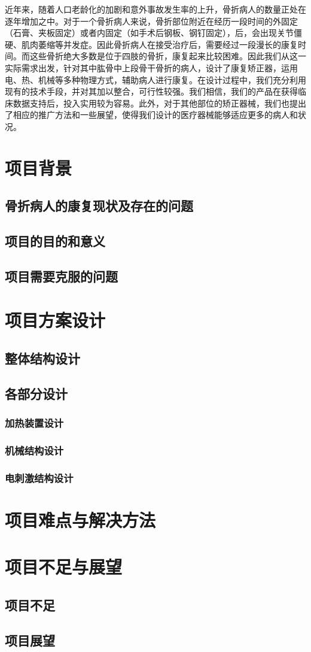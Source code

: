 \documentclass[UTF8]{ctexart}
\begin{document}
    近年来，随着人口老龄化的加剧和意外事故发生率的上升，骨折病人的数量正处在逐年增加之中。对于一个骨折病人来说，骨折部位附近在经历一段时间的外固定（石膏、夹板固定）或者内固定（如手术后钢板、钢钉固定），后，会出现关节僵硬、肌肉萎缩等并发症。因此骨折病人在接受治疗后，需要经过一段漫长的康复时间。而这些骨折绝大多数是位于四肢的骨折，康复起来比较困难。因此我们从这一实际需求出发，针对其中肱骨中上段骨干骨折的病人，设计了康复矫正器，运用电、热、机械等多种物理方式，辅助病人进行康复。在设计过程中，我们充分利用现有的技术手段，并对其加以整合，可行性较强。我们相信，我们的产品在获得临床数据支持后，投入实用较为容易。此外，对于其他部位的矫正器械，我们也提出了相应的推广方法和一些展望，使得我们设计的医疗器械能够适应更多的病人和状况。

\section{项目背景}
    \subsection{骨折病人的康复现状及存在的问题}
    \subsection{项目的目的和意义}
    \subsection{项目需要克服的问题}
\section{项目方案设计}
    \subsection{整体结构设计}
    \subsection{各部分设计}
        \subsubsection{加热装置设计}
        \subsubsection{机械结构设计}
        \subsubsection{电刺激结构设计}
\section{项目难点与解决方法}

\section{项目不足与展望}
    \subsection{项目不足}
    \subsection{项目展望}
    
\end{document}
